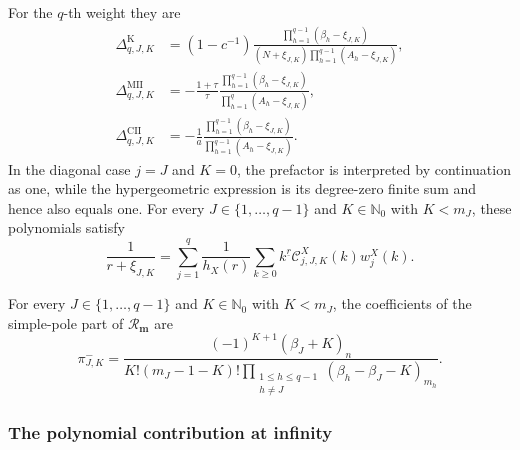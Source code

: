 \documentclass[10pt]{amsart}
\newcommand{\Nzero}{\mathbb N_0}
\newcommand{\mm}{\boldsymbol m}
\newcommand{\fall}[2]{#1^{\underline{#2}}}
\theoremstyle{plain}
\theoremstyle{definition}
\theoremstyle{remark}
\begin{document}
For the \(q\)-th weight they are
\begin{align}
 \Delta_{q,J,K}^{\mathrm K}
 &=(1-c^{-1})
   \frac{\prod_{h=1}^{q-1}(\beta_h-\xi_{J,K})}
   {(N+\xi_{J,K})\prod_{h=1}^{q-1}(A_h-\xi_{J,K})},
 \label{eq:K-finite-pole-prefactor-base}\\
 \Delta_{q,J,K}^{\mathrm{MII}}
 &=-\frac{1+\tau}{\tau}
   \frac{\prod_{h=1}^{q-1}(\beta_h-\xi_{J,K})}
   {\prod_{h=1}^{q}(A_h-\xi_{J,K})},
 \label{eq:MII-finite-pole-prefactor-base}\\
 \Delta_{q,J,K}^{\mathrm{CII}}
 &=-\frac1a
   \frac{\prod_{h=1}^{q-1}(\beta_h-\xi_{J,K})}
   {\prod_{h=1}^{q-1}(A_h-\xi_{J,K})}.
 \label{eq:CII-finite-pole-prefactor-base}
\end{align}
In the diagonal case \(j=J\) and \(K=0\), the prefactor is interpreted by
continuation as one, while the hypergeometric expression is its
degree-zero finite sum and hence also equals one. For every
\(J\in\{1,\ldots,q-1\}\) and \(K\in\Nzero\) with \(K<m_J\), these
polynomials satisfy
\begin{equation}
 \frac1{r+\xi_{J,K}}
 =\sum_{j=1}^q\frac1{h_X(r)}
   \sum_{k\ge0}\fall{k}{r}\mathcal C_{j,J,K}^X(k)w_j^X(k).
 \label{eq:finite-pole-block-pairing}
\end{equation}

For every \(J\in\{1,\ldots,q-1\}\) and \(K\in\Nzero\) with
\(K<m_J\), the coefficients of the simple-pole part of
\(\mathcal R_{\mm}\) are
\begin{equation}
 \pi_{J,K}^{-}=
 \frac{(-1)^{K+1}(\beta_J+K)_n}
 {K!(m_J-1-K)!
  \prod_{\substack{1\le h\le q-1\\h\ne J}}
  (\beta_h-\beta_J-K)_{m_h}}.
 \label{eq:unreflected-finite-pole-coefficient}
\end{equation}

\subsubsection{The polynomial contribution at infinity}
\end{document}
